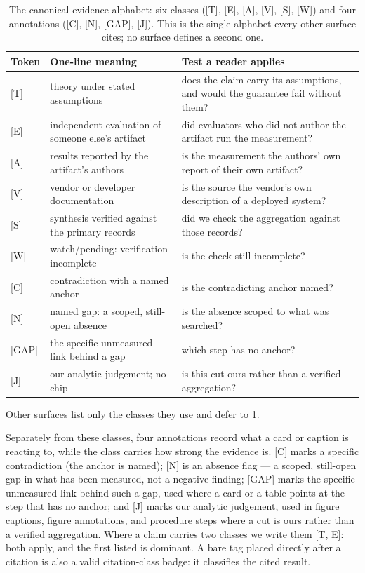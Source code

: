 \begin{table}[!t]
\centering
\small
\begin{tabular}{@{}l p{5.3cm} p{6.3cm}@{}}
\toprule
Token & One-line meaning & Test a reader applies \\
\midrule
\textsf{[T]} & theory under stated assumptions & does the claim carry its assumptions, and would the guarantee fail without them? \\
\textsf{[E]} & independent evaluation of someone else's artifact & did evaluators who did not author the artifact run the measurement? \\
\textsf{[A]} & results reported by the artifact's authors & is the measurement the authors' own report of their own artifact? \\
\textsf{[V]} & vendor or developer documentation & is the source the vendor's own description of a deployed system? \\
\textsf{[S]} & synthesis verified against the primary records & did we check the aggregation against those records? \\
\textsf{[W]} & watch/pending: verification incomplete & is the check still incomplete? \\
\textsf{[C]} & contradiction with a named anchor & is the contradicting anchor named? \\
\textsf{[N]} & named gap: a scoped, still-open absence & is the absence scoped to what was searched? \\
\textsf{[GAP]} & the specific unmeasured link behind a gap & which step has no anchor? \\
\textsf{[J]} & our analytic judgement; no chip & is this cut ours rather than a verified aggregation? \\
\bottomrule
\end{tabular}
\caption{The canonical evidence alphabet: six classes ([T], [E], [A], [V], [S], [W]) and four
annotations ([C], [N], [GAP], [J]). This is the single alphabet every other surface cites; no
surface defines a second one.}
\label{tab:evidence-classes}
\end{table}

Other surfaces list only the classes they use and defer to \cref{tab:evidence-classes}.

Separately from these classes, four annotations record what a card or caption is reacting to,
while the class carries how strong the evidence is.
[C] marks a specific contradiction (the anchor is named);
[N] is an absence flag --- a scoped, still-open gap in what has been measured, not a negative
finding; [GAP] marks the
specific unmeasured link behind such a gap, used where a card or a
table points at the step that has no anchor; and [J] marks our analytic judgement, used in figure
captions, figure annotations, and procedure steps where a cut is ours rather than a verified
aggregation. Where a claim carries two classes
we write them [T, E]: both apply, and the first listed is dominant. A bare tag placed directly
after a citation is also a valid citation-class badge: it classifies the cited result.

